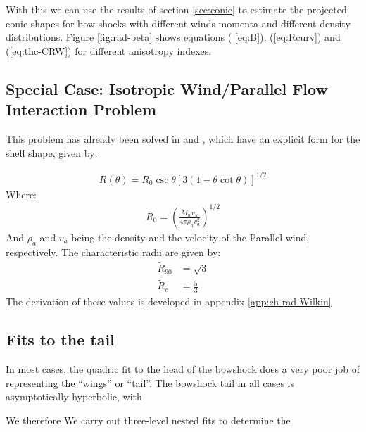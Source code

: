 
With this we can use the results of section \ref{sec:conic} to estimate the projected conic shapes for bow shocks with different winds 
momenta and different density distributions. Figure \ref{fig:rad-beta} shows equations ( \ref{eq:B}), (\ref{eq:Rcurv}) and (\ref{eq:thc-CRW}) for different anisotropy indexes. 

\subsection{Special Case: Isotropic Wind/Parallel Flow Interaction Problem}

This problem has already been solved in \citet{Wilkin:1996a} and \CRW{}, which have an explicit form for the shell shape, given by:

\begin{align}
  R(\theta) = R_0\csc\theta\left[3(1-\theta\cot\theta)\right]^{1/2} \label{eq:R-Wilkin}
\end{align}
Where:
\begin{align}
  R_0 = \left(\frac{\dot{M}_wv_w}{4\pi\rho_a v_a^2}\right)^{1/2}
\end{align}
And $\rho_a$ and $v_a$ being the density and the velocity of the Parallel wind, respectively.
The characteristic radii are given by:
\begin{align}
  \tilde{R}_{90} &= \sqrt{3} \\
  \tilde{R}_c &= \frac{5}{3}
\end{align}
The derivation of these values is developed in appendix \ref{app:ch-rad-Wilkin}

\subsection{Fits to the tail}
\label{sec:fits-tail}

In most cases, the quadric fit to the head of the bowshock does a very poor job of representing the ``wings'' or ``tail''.  The bowshock tail in all cases is asymptotically hyperbolic, with 

We therefore 
We carry out three-level nested fits to determine the 

